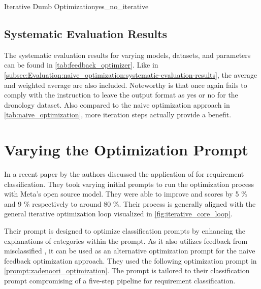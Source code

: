 \begin{prompt}{\KISS Iterative Dumb Optimization}{yes_no_iterative}
\subsection{Systematic Evaluation Results}
\label{subsec:Evaluation:simple_feedback_optimization:systematic-evaluation-results}

The systematic evaluation results for varying models, datasets, and parameters can be found in \autoref{tab:feedback_optimizer}.
Like in \autoref{subsec:Evaluation:naive_optimization:systematic-evaluation-results}, the average and weighted average are also included.
Noteworthy is that \llama once again fails to comply with the instruction to leave the output format as \textquotesingle yes \textquotesingle or \textquotesingle no \textquotesingle for the dronology dataset. 
Also compared to the naive optimization approach in \autoref{tab:naive_optimization}, more iteration steps actually provide a benefit.

\begin{landscape}
    \begin{table}
        \centering
        \renewcommand{\arraystretch}{1}
        
        \renewcommand{\arraystretch}{1}
        \caption{Naive prompt optimization approach considering previous misclassified \TLs}
        \label{tab:feedback_optimizer}
    \end{table}
\end{landscape}


\section{Varying the Optimization Prompt}
\label{sec:Evaluation:varying-the-optimization-prompt}
In a recent paper by  the authors discussed the application of \APE for requirement classification.
They took varying initial prompts to run the optimization process with Meta's open source \llama model.
They were able to improve \fone and \ftwo scores by 5 \% and 9 \% respectively to around 80 \%.
Their \APE process is generally aligned with the general iterative optimization loop visualized in \autoref{fig:iterative_core_loop}.

Their prompt is designed to optimize classification prompts by enhancing the explanations of categories within the prompt.
As it also utilizes feedback from misclassified \TLs, it can be used as an alternative optimization prompt for the naive feedback optimization approach.
They used the following optimization prompt in \autoref{prompt:zadenoori_optimization}.
The prompt is tailored to their \CoT classification prompt compromising of a five-step pipeline for requirement classification.


\end{prompt}
